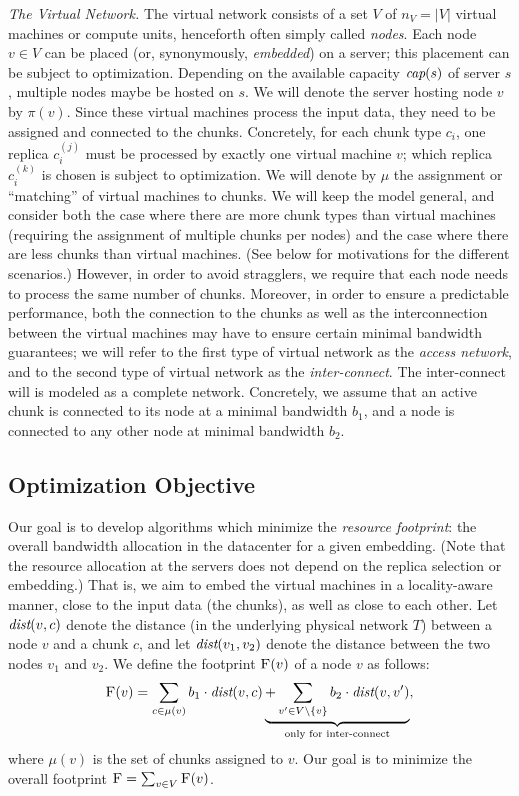 \documentclass[9pt,twocolumn]{scrartcl}
\newcommand{\VirtualNodes}{\ensuremath{V}}
\newcommand{\achunk}{\ensuremath{c}}
\newcommand{\capacity}{\emph{cap}}
\newcommand{\dist}{\emph{dist}}
\newcommand{\Cost}{\textsc{F}}
\newcommand{\Tree}{\ensuremath{T}}
\newcommand{\CostTrans}{\ensuremath{b_1}}
\newcommand{\CostCom}{\ensuremath{b_2}}
\begin{document}
\emph{The Virtual Network.} The virtual network consists of a set $\VirtualNodes$ of $n_V=|\VirtualNodes|$ virtual machines or compute
 units, henceforth often simply called \emph{nodes}.
Each node $v \in \VirtualNodes$ can be placed (or, synonymously, \emph{embedded}) on a server; this placement can be subject
to optimization.
Depending on the available capacity $\capacity(s)$ of server $s$, multiple nodes maybe be hosted on $s$.
We will denote the server hosting node $v$ by $\pi(v)$.
Since these virtual machines process the input data, they need to be assigned and connected to the
chunks. Concretely, for each chunk type $\achunk_i$, one replica $\achunk_{i}^{(j)}$ must be processed by exactly one virtual machine $v$;
which replica $\achunk_{i}^{(k)}$ is chosen is subject to optimization.
We will denote by $\mu$ the assignment or ``matching'' of virtual machines to chunks.
We will keep the model general, and consider both the case where there are more chunk types
than virtual machines (requiring the assignment of multiple chunks per nodes) and the case
where there are less chunks than virtual machines. (See below for motivations for the different scenarios.)
However, in order to avoid stragglers, we require that each node needs to process the same number of chunks.
Moreover, in order to ensure a predictable performance, both the connection to the chunks
as well as the interconnection between the virtual machines may have to ensure certain
minimal bandwidth guarantees; we will refer to the first type of virtual network as the \emph{access
network}, and to the second type of virtual network as the \emph{inter-connect}. The inter-connect will
is modeled as a complete network. Concretely, we assume that an  active chunk
is connected to its node at a minimal bandwidth $\CostTrans$, and a node is connected to any other node
at minimal bandwidth $\CostCom$.


\subsection{Optimization Objective}

Our goal is to develop algorithms which minimize
the \emph{resource footprint}: the overall bandwidth allocation in the datacenter for a given embedding. (Note that
the resource allocation at the servers does not depend on the replica selection or embedding.) That is,
we aim to embed the virtual machines in a locality-aware manner, close to the input data
(the chunks), as well as close to
each other. Let $\dist(v,\achunk)$ denote the distance (in the underlying physical network $\Tree$) between a node $v$ and a
chunk $\achunk$, and let $\dist(v_1,v_2)$ denote the distance between the two nodes $v_1$ and $v_2$.
We define the footprint $\Cost(v)$ of a node $v$ as follows:
$$
\Cost(v) = \sum_{\achunk\in \mu(v)} \CostTrans \cdot \dist(v,\achunk) \underbrace{+ \sum_{v' \in \VirtualNodes\setminus\{v\}} \CostCom \cdot \dist(v,v')}_{\text{only for inter-connect}},
$$
\noindent where $\mu(v)$ is the set of chunks assigned to $v$. Our goal is to minimize the overall footprint
$\Cost=\sum_{v\in V} \Cost(v)$.
\end{document}
